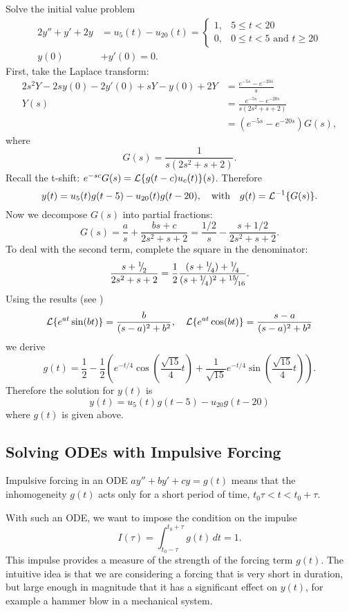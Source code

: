 \begin{eg}
	Solve the initial value problem
	\begin{align*}
		2y'' + y' + 2y &= u_5(t) - u_{20}(t) = \begin{cases}
			1, & 5 \leq t < 20 \\
			0, & 0 \leq t < 5 \text{ and } t \geq 20
		\end{cases} \\
		y(0) &+ y'(0) = 0.
	\end{align*}
	First, take the Laplace transform:
	\begin{align*}
		2s^2Y - 2sy(0) - 2y'(0) + sY - y(0) + 2Y &= \frac{e^{-5s} - e^{-20s}}{s} \\
		Y(s) &= \frac{e^{-5s} - e^{-20s}}{s(2s^2 + s + 2)} \\
		&= (e^{-5s} - e^{-20s})G(s),
	\end{align*}
	where
	\[
		G(s) = \frac{1}{s(2s^2 + s + 2)}.
	\]
	Recall the t-shift: $e^{-sc}G(s) = \mathcal{L}\{g(t-c)u_c(t)\}(s)$. Therefore
	\[
		y(t) = u_5(t)g(t-5) - u_{20}(t)g(t-20), \quad\text{with}\quad g(t) = \mathcal{L}^{-1}\{G(s)\}.
	\]
	Now we decompose $G(s)$ into partial fractions:
	\[
		G(s) = \frac{a}{s} + \frac{bs+c}{2s^2+s+2} = \frac{1/2}{s} - \frac{s+1/2}{2s^2+s+2}.
	\]
	To deal with the second term, complete the square in the denominator:
	\[
		\frac{s+\sfrac12}{2s^2+s+2} = \frac12 \frac{(s+\sfrac14)+\sfrac14}{(s+\sfrac14)^2+\sfrac{15}{16}}.
	\]
	Using the results (see )
	\[
		\mathcal{L}\{e^{at}\sin(bt)\} = \frac{b}{(s-a)^2+b^2}, \quad \mathcal{L}\{e^{at}\cos(bt)\} = \frac{s-a}{(s-a)^2+b^2}
	\]
	we derive
	\[
		g(t) = \frac12 - \frac12 \left(e^{-t/4}\cos\left(\frac{\sqrt{15}}{4}t\right) + \frac{1}{\sqrt{15}} e^{-t/4}\sin\left(\frac{\sqrt{15}}{4}t\right)\right).
	\]
	Therefore the solution for $y(t)$ is
	\[
		y(t) = u_5(t)g(t-5) - u_{20}g(t-20)
	\]
	where $g(t)$ is given above.
\end{eg}

\subsection{Solving ODEs with Impulsive Forcing}

Impulsive forcing in an ODE $ay''+by'+cy=g(t)$ means that the inhomogeneity $g(t)$ acts only for a short period of time, $t_0\tau < t < t_0+\tau$.

With such an ODE, we want to impose the condition on the impulse
\[
	I(\tau) = \int_{t_0-\tau}^{t_0+\tau} g(t) \,dt = 1.
\]
This impulse provides a measure of the strength of the forcing term $g(t)$. The intuitive idea is that we are considering a forcing that is very short in duration, but large enough in magnitude that it has a significant effect on $y(t)$, for example a hammer blow in a mechanical system.


